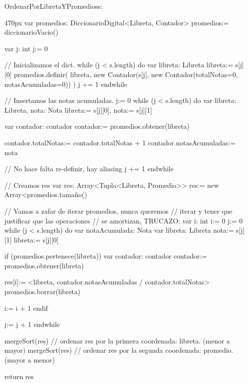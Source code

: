 \documentclass[10pt,a4paper]{article}
\begin{document}
\newpage
{}


\begin{proc}{OrdenarPorLibretaYPromedios}{\In s: }{}
  \begin{ImplementationCode}{470px}
      var promedios: DiccionarioDigital<Libreta, Contador>
      promedios:= diccionarioVacio()

      var j: int
          j:= 0

      // Inicializamos el dict.
      while (j < s.length) do
        var libreta: Libreta
            libreta:= s[j][0]
        promedios.definir(
          libreta,
          new Contador(s[j], new Contador(totalNotas=0, notasAcumuladas=0))
        )
        j += 1
      endwhile

      // Insertamos las notas acumuladas.
      j:= 0
      while (j < s.length) do
        var libreta: Libreta, nota: Nota
            libreta:= s[j][0], nota:= s[j][1]

        var contador: contador
            contador:= promedios.obtener(libreta)

        contador.totalNotas:= contador.totalNotas + 1
        contador.notasAcumuladas:= nota

        // No hace falta re-definir, hay aliasing
        j += 1
      endwhile

      // Creamos res
      var res: Array<Tupla<Libreta, Promedio>>
          res:= new Array<promedios.tamaño()

      // Vamos a zafar de iterar promedios, nunca queremos
      // iterar y tener que justificar que las operaciones
      // se amortizan, TRUCAZO:
      var i: int
          i:= 0
          j:= 0
      while (j < s.length) do
        var notaAcumulada: Nota
        var libreta: Libreta
            nota:= s[j][1]
            libreta:= s[j][0]
      
        if (promedios.pertenece(libreta))
          var contador: contador
              contador:= promedios.obtener(libreta)

          res[i]:= <libreta, contador.notasAcumuladas / contador.totalNotas>
          promedios.borrar(libreta)

          i:= i + 1
        endif

        j:= j + 1
      endwhile

      mergeSort(res) // ordenar res por la primera coordenada: libreta. (menor a mayor)
      mergeSort(res) // ordenar res por la segunda coordenada: promedio. (mayor a menor)

      return res
  \end{ImplementationCode}
\end{proc}
\end{document}
